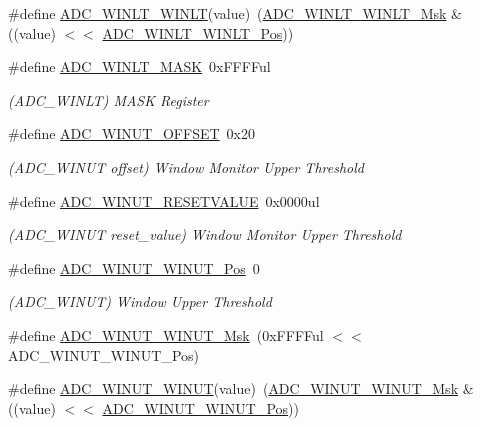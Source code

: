 \begin{DoxyCompactItemize}
\#define \mbox{\hyperlink{group___s_a_m_d21___a_d_c_ga428dbb684b20bfb0502551074b1c7f6e}{A\+D\+C\+\_\+\+W\+I\+N\+L\+T\+\_\+\+W\+I\+N\+LT}}(value)~(\mbox{\hyperlink{group___s_a_m_d21___a_d_c_ga29c9d6e11a88066dbbb16527919a90c1}{A\+D\+C\+\_\+\+W\+I\+N\+L\+T\+\_\+\+W\+I\+N\+L\+T\+\_\+\+Msk}} \& ((value) $<$$<$ \mbox{\hyperlink{group___s_a_m_d21___a_d_c_ga8d8679254a2a5ba70a7378316be2b2e2}{A\+D\+C\+\_\+\+W\+I\+N\+L\+T\+\_\+\+W\+I\+N\+L\+T\+\_\+\+Pos}}))
\item 
\#define \mbox{\hyperlink{group___s_a_m_d21___a_d_c_gabb4377b4ea319484fcd2305d2fe98641}{A\+D\+C\+\_\+\+W\+I\+N\+L\+T\+\_\+\+M\+A\+SK}}~0x\+F\+F\+F\+Ful
\begin{DoxyCompactList}\small\item\em (A\+D\+C\+\_\+\+W\+I\+N\+LT) M\+A\+SK Register \end{DoxyCompactList}\item 
\#define \mbox{\hyperlink{group___s_a_m_d21___a_d_c_gacd3f5a80c82eef920b9ebb22f630d852}{A\+D\+C\+\_\+\+W\+I\+N\+U\+T\+\_\+\+O\+F\+F\+S\+ET}}~0x20
\begin{DoxyCompactList}\small\item\em (A\+D\+C\+\_\+\+W\+I\+N\+UT offset) Window Monitor Upper Threshold \end{DoxyCompactList}\item 
\#define \mbox{\hyperlink{group___s_a_m_d21___a_d_c_gaf85342ba210b0c7797fceb49e8d7c054}{A\+D\+C\+\_\+\+W\+I\+N\+U\+T\+\_\+\+R\+E\+S\+E\+T\+V\+A\+L\+UE}}~0x0000ul
\begin{DoxyCompactList}\small\item\em (A\+D\+C\+\_\+\+W\+I\+N\+UT reset\+\_\+value) Window Monitor Upper Threshold \end{DoxyCompactList}\item 
\#define \mbox{\hyperlink{group___s_a_m_d21___a_d_c_ga568d14d8329991a576f1cf45560320e8}{A\+D\+C\+\_\+\+W\+I\+N\+U\+T\+\_\+\+W\+I\+N\+U\+T\+\_\+\+Pos}}~0
\begin{DoxyCompactList}\small\item\em (A\+D\+C\+\_\+\+W\+I\+N\+UT) Window Upper Threshold \end{DoxyCompactList}\item 
\#define \mbox{\hyperlink{group___s_a_m_d21___a_d_c_ga9475b0d3b2f4635ef6f91197a23fbd0a}{A\+D\+C\+\_\+\+W\+I\+N\+U\+T\+\_\+\+W\+I\+N\+U\+T\+\_\+\+Msk}}~(0x\+F\+F\+F\+Ful $<$$<$ A\+D\+C\+\_\+\+W\+I\+N\+U\+T\+\_\+\+W\+I\+N\+U\+T\+\_\+\+Pos)
\item 
\#define \mbox{\hyperlink{group___s_a_m_d21___a_d_c_ga1a2e8bfd63894a71e7aba18cec13a07a}{A\+D\+C\+\_\+\+W\+I\+N\+U\+T\+\_\+\+W\+I\+N\+UT}}(value)~(\mbox{\hyperlink{group___s_a_m_d21___a_d_c_ga9475b0d3b2f4635ef6f91197a23fbd0a}{A\+D\+C\+\_\+\+W\+I\+N\+U\+T\+\_\+\+W\+I\+N\+U\+T\+\_\+\+Msk}} \& ((value) $<$$<$ \mbox{\hyperlink{group___s_a_m_d21___a_d_c_ga568d14d8329991a576f1cf45560320e8}{A\+D\+C\+\_\+\+W\+I\+N\+U\+T\+\_\+\+W\+I\+N\+U\+T\+\_\+\+Pos}}))
$$
\end{DoxyCompactItemize}
